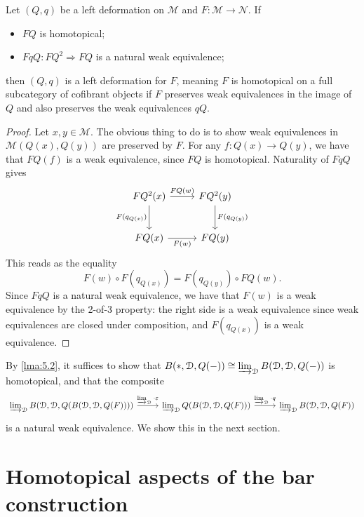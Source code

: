 \begin{lemma}\label{lma:5.2}
	Let $(Q,q)$ be a left deformation on $\mathcal{M} $ and $F : \mathcal{M}  \to \mathcal{N} $. If
	\begin{itemize}
		\item $FQ$ is homotopical;
		\item $FqQ : FQ^2 \Rightarrow FQ$ is a natural weak equivalence;
	\end{itemize}
	then $(Q,q)$ is a left deformation for $F$, meaning $F$ is homotopical on a full subcategory of cofibrant objects if $F$ preserves weak equivalences in the image of $Q$ and also preserves the weak equivalences $qQ$.
\end{lemma}
\begin{proof}
	Let $x,y\in\mathcal{M}$. The obvious thing to do is to show weak equivalences in $\mathcal{M} (Q(x),Q(y))$ are preserved by $F$. For any $f : Q(x) \to Q(y)$, we have that $FQ(f)$ is a weak equivalence, since $FQ$ is homotopical. Naturality of $FqQ$ gives
	\[\begin{tikzcd}[row sep = 2.5em, column sep = 2.5em]
		FQ^2(x)\ar[" FQ(w) ", r] \ar[" F(q_{Q(x)}) "', d]  & FQ^2(y)\ar[" F(q_{Q(y)} ) ", d]  \\
	FQ(x)\ar[" F(w) "', r]  & FQ(y)
	\end{tikzcd}\]
	This reads as the equality
	\[
		F(w)\circ F(q_{Q(x)} )=F(q_{Q(y)} )\circ FQ(w)
	.\]
	Since $FqQ$ is a natural weak equivalence, we have that $F(w)$ is a weak equivalence by the 2-of-3 property: the right side is a weak equivalence since weak equivalences are closed under composition, and $F(q_{Q(x)} )$ is a weak equivalence.
\end{proof}

By \cref{lma:5.2}, it suffices to show that $B(*,\mathcal{D} ,Q(-))\cong \varinjlim _\mathcal{D} B(\mathcal{D} ,\mathcal{D} ,Q(-))$ is homotopical, and that the composite
\[\begin{tikzcd}[row sep = 2.5em, column sep = 2.5em]
\varinjlim _\mathcal{D} B(\mathcal{D} ,\mathcal{D} ,Q(B(\mathcal{D} ,\mathcal{D} ,Q(F))))\ar[" \varinjlim _\mathcal{D} \cdot \varepsilon  ", r]  & \varinjlim _\mathcal{D} Q(B(\mathcal{D} ,\mathcal{D} ,Q(F)))\ar[" \varinjlim _\mathcal{D} \cdot q ", r]  & \varinjlim _\mathcal{D} B(\mathcal{D} ,\mathcal{D} ,Q(F))
\end{tikzcd}\]
is a natural weak equivalence. We show this in the next section.

\section{Homotopical aspects of the bar construction}

